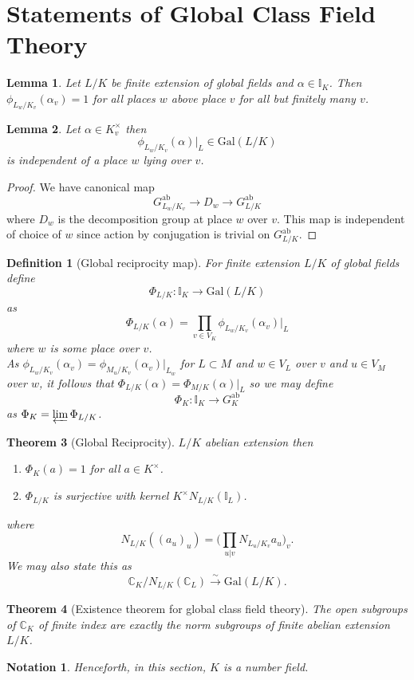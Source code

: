 \documentclass[twoside, 12pt]{iiser-thesis}
\newtheorem{thm}{Theorem}[section]
\newtheorem{lem}[thm]{ Lemma}
\newtheorem{defi}{ Definition}[section]
\newtheorem{notation}{ Notation}[section]
\newcommand{\C}{\mathbb{C}}
\newcommand{\I}{\mathbb{I}}
\newcommand{\gal}{\text{Gal}}
\newcommand{\x}{\times}
\newcommand{\ab}{\text{ab}}
\begin{document}
\section{Statements of Global Class Field Theory}
\begin{lem}
Let $L/K$ be finite extension of global fields and $\alpha \in \I _K$. Then $\phi _{L_w/K_v} (\alpha _v) =1$ for all places $w$ above place $v$ for all but finitely many $v$.
\end{lem}
\begin{lem}
Let $\alpha \in K_v^\x $ then \[\phi _{L_w/K_v}(\alpha ) \big | _L \in \gal (L/K)\] is independent of a place $w$ lying over $v$.
\end{lem}
\begin{proof}
We have canonical map \[G^\ab _{L_w/K_v} \rightarrow D_w \rightarrow G _{L/K} ^\ab \] where $D_w$ is the decomposition group at place $w$ over $v$. This map is independent of choice of $w$ since action by conjugation is trivial on $G^\ab _{L/K}$.
\end{proof}
\begin{defi}[Global reciprocity map]
For finite extension $L/K$ of global fields define \[ \Phi _{L/K} : \I _K \rightarrow \gal (L/K) \] as \[\Phi _{L/K} (\alpha ) = \prod _{v\in V_K} \phi _{L_w/K_v}(\alpha _v) \big |_L \] where $w$ is some place over $v$.  \\
As $\phi _{L_w/K_v}(\alpha _v)= \phi _{M_u/K_v}(\alpha _v) \big |_{L_w} $ for $L \subset M$ and $w \in V_L$ over $v$ and $u \in V_M$ over $w$, it follows that $\Phi _{L/K}(\alpha ) = \Phi _{M/K} (\alpha ) \big |_L$ so we may define \[ \Phi _K : \I _K \rightarrow G^\ab _K \] as $\Phi _K = \varprojlim \Phi _{L/K}$.
\end{defi}
\begin{thm}[Global Reciprocity] 
$L/K$ abelian extension then 
\begin{enumerate}
\item $\Phi _K (a) =1 $ for all $a \in K^\x$.
\item $\Phi _{L/K}$ is surjective with kernel $K^\x N_{L/K}(\I _L)$.

\end{enumerate}
where \[ N_{L/K} ((a_u)_u) = \big ( \prod _{u |v} N_{L_u/K_v} a_u ) _v .\]
We may also state this as \[ \C _K/N_{L/K}(\C _L) \xrightarrow{\sim} \gal (L/K) .\]
\end{thm}
\begin{thm}[Existence theorem for global class field theory]
The open subgroups of $\C _K$ of finite index are exactly the norm subgroups of finite abelian extension $L/K$.
\end{thm}
\begin{notation}
Henceforth, in this section, $K$ is a number field. 
\end{notation}
\end{document}
